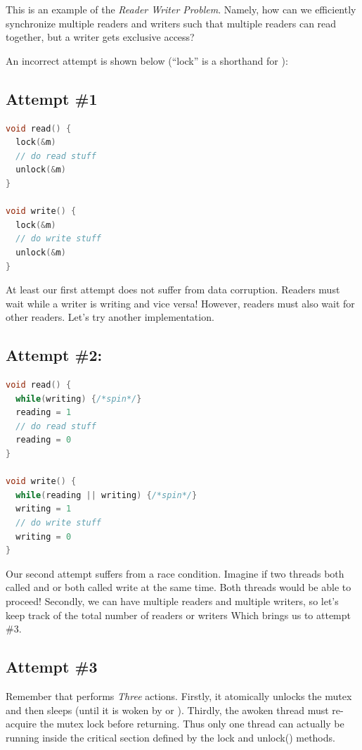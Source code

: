This is an example of the \emph{Reader Writer Problem}.
Namely, how can we efficiently synchronize multiple readers and writers such that multiple readers can read together, but a writer gets exclusive access?

An incorrect attempt is shown below (``lock'' is a shorthand for ):

\subsection{Attempt \#1}

\begin{lstlisting}[language=C]
void read() {
  lock(&m)
  // do read stuff
  unlock(&m)
}

void write() {
  lock(&m)
  // do write stuff
  unlock(&m)
}
\end{lstlisting}

At least our first attempt does not suffer from data corruption.
Readers must wait while a writer is writing and vice versa!
However, readers must also wait for other readers.
Let's try another implementation.

\subsection{Attempt \#2:}

\begin{lstlisting}[language=C]
void read() {
  while(writing) {/*spin*/}
  reading = 1
  // do read stuff
  reading = 0
}

void write() {
  while(reading || writing) {/*spin*/}
  writing = 1
  // do write stuff
  writing = 0
}
\end{lstlisting}

Our second attempt suffers from a race condition.
Imagine if two threads both called  and  or both called write at the same time.
Both threads would be able to proceed!
Secondly, we can have multiple readers and multiple writers, so let's keep track of the total number of readers or writers
Which brings us to attempt \#3.

\subsection{Attempt \#3}

Remember that  performs \emph{Three} actions.
Firstly, it atomically unlocks the mutex and then sleeps (until it is woken by  or ).
Thirdly, the awoken thread must re-acquire the mutex lock before returning.
Thus only one thread can actually be running inside the critical section defined by the lock and unlock() methods.


